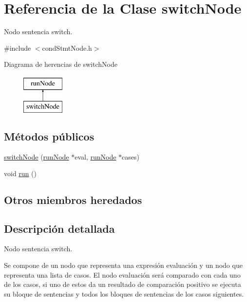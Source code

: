 \hypertarget{classswitchNode}{\section{Referencia de la Clase switch\-Node}
\label{classswitchNode}
}


Nodo sentencia switch.  




{\ttfamily \#include $<$cond\-Stmt\-Node.\-h$>$}

Diagrama de herencias de switch\-Node\begin{figure}[H]
\begin{center}
\leavevmode
\includegraphics[height=2.000000cm]{classswitchNode}
\end{center}
\end{figure}
\subsection*{Métodos públicos}
\begin{DoxyCompactItemize}
\item 
\hyperlink{classswitchNode_a689b5159d9232747121a510fb0e4c6c6}{switch\-Node} (\hyperlink{classrunNode}{run\-Node} $\ast$eval, \hyperlink{classrunNode}{run\-Node} $\ast$cases)
\item 
void \hyperlink{classswitchNode_a7376e88757e30536bd26878d58bc2069}{run} ()
\end{DoxyCompactItemize}
\subsection*{Otros miembros heredados}


\subsection{Descripción detallada}
Nodo sentencia switch. 

Se compone de un nodo que representa una expresión evaluación y un nodo que representa una lista de casos. El nodo evaluación será comparado con cada uno de los casos, si uno de estos da un resultado de comparación positivo se ejecuta su bloque de sentencias y todos los bloques de sentencias de los casos siguientes.

